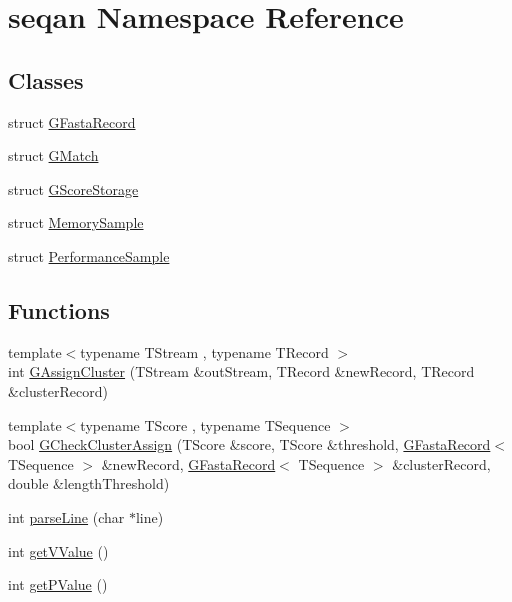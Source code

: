 \hypertarget{namespaceseqan}{\section{seqan Namespace Reference}
\label{namespaceseqan}
}
\subsection*{Classes}
\begin{DoxyCompactItemize}
\item 
struct \hyperlink{structseqan_1_1_g_fasta_record}{G\-Fasta\-Record}
\item 
struct \hyperlink{structseqan_1_1_g_match}{G\-Match}
\item 
struct \hyperlink{structseqan_1_1_g_score_storage}{G\-Score\-Storage}
\item 
struct \hyperlink{structseqan_1_1_memory_sample}{Memory\-Sample}
\item 
struct \hyperlink{structseqan_1_1_performance_sample}{Performance\-Sample}
\end{DoxyCompactItemize}
\subsection*{Functions}
\begin{DoxyCompactItemize}
\item 
{\footnotesize template$<$typename T\-Stream , typename T\-Record $>$ }\\int \hyperlink{namespaceseqan_a845eac8229b25534b1893d9547ff86db}{G\-Assign\-Cluster} (T\-Stream \&out\-Stream, T\-Record \&new\-Record, T\-Record \&cluster\-Record)
\item 
{\footnotesize template$<$typename T\-Score , typename T\-Sequence $>$ }\\bool \hyperlink{namespaceseqan_aeda48428fe6fb5b47547739a2e304d55}{G\-Check\-Cluster\-Assign} (T\-Score \&score, T\-Score \&threshold, \hyperlink{structseqan_1_1_g_fasta_record}{G\-Fasta\-Record}$<$ T\-Sequence $>$ \&new\-Record, \hyperlink{structseqan_1_1_g_fasta_record}{G\-Fasta\-Record}$<$ T\-Sequence $>$ \&cluster\-Record, double \&length\-Threshold)
\item 
int \hyperlink{namespaceseqan_abfc1b9b4fd3e0c63871678c69eab5bf2}{parse\-Line} (char $\ast$line)
\item 
int \hyperlink{namespaceseqan_abfe039b148512fc0d59f04e901432c92}{get\-V\-Value} ()
\item 
int \hyperlink{namespaceseqan_a943905857877eecc596a716ee29e2d63}{get\-P\-Value} ()
\end{DoxyCompactItemize}


